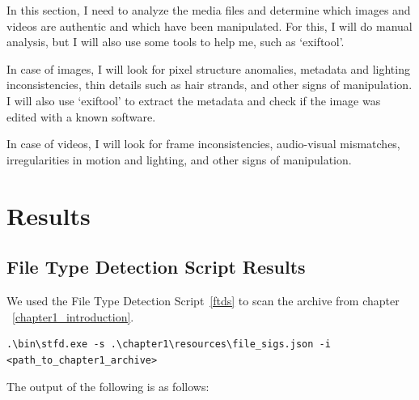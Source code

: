 \documentclass[pdflatex,sn-mathphys-num]{sn-jnl}
\begin{document}
\par In this section, I need to analyze the media files and determine which images and videos are authentic and which
have been manipulated. For this, I will do manual analysis, but I will also use some tools to help me, such as `exiftool'.

\par In case of images, I will look for pixel structure anomalies, metadata and lighting inconsistencies, thin details
such as hair strands, and other signs of manipulation. I will also use `exiftool' to extract the metadata and check
if the image was edited with a known software.

\par In case of videos, I will look for frame inconsistencies, audio-visual mismatches, irregularities in motion and 
lighting, and other signs of manipulation.

\section{Results}\label{results}

\subsection{File Type Detection Script Results}\label{chapter1_results}

\par We used the File Type Detection Script~\ref{ftds} to scan the archive from chapter ~\ref{chapter1_introduction}.

\begin{lstlisting}[style=bashstyle]
.\bin\stfd.exe -s .\chapter1\resources\file_sigs.json -i <path_to_chapter1_archive>
\end{lstlisting}

\par The output of the following is as follows:
\end{document}
